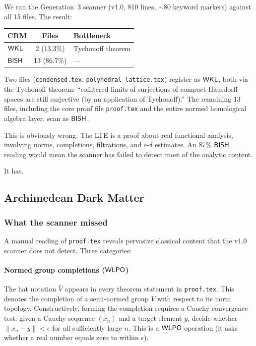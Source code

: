 We ran the Generation~3 scanner (v1.0, 810 lines, ${\sim}80$ keyword
markers) against all 15 files.  The result:

\begin{center}
\begin{tabular}{lcl}
\toprule
\textbf{CRM} & \textbf{Files} & \textbf{Bottleneck} \\
\midrule
$\textsf{WKL}$  & 2 (13.3\%) & Tychonoff theorem \\
$\textsf{BISH}$ & 13 (86.7\%) & --- \\
\bottomrule
\end{tabular}
\end{center}

Two files (\texttt{condensed.tex}, \texttt{polyhedral\_lattice.tex})
register as $\textsf{WKL}$, both via the Tychonoff theorem: ``cofiltered limits
of surjections of compact Hausdorff spaces are still surjective (by an
application of Tychonoff).''  The remaining 13 files, including the
core proof file \texttt{proof.tex} and the entire normed homological
algebra layer, scan as $\textsf{BISH}$.

This is obviously wrong.  The LTE is a proof about real functional
analysis, involving norms, completions, filtrations, and
$\varepsilon$-$\delta$ estimates.  An 87\% $\textsf{BISH}$ reading would
mean the scanner has failed to detect most of the analytic content.

It has.


\subsection{Archimedean Dark Matter}\label{part:dark-matter}

\subsubsection{What the scanner missed}\label{sec:missed}

A manual reading of \texttt{proof.tex} reveals pervasive classical
content that the v1.0 scanner does not detect.  Three categories:

\paragraph{Normed group completions ($\textsf{WLPO}$)}

The hat notation $\widehat{V}$ appears in every theorem statement in
\texttt{proof.tex}.  This denotes the completion of a semi-normed
group $V$ with respect to its norm topology.  Constructively, forming
the completion requires a Cauchy convergence test: given a Cauchy
sequence $(x_n)$ and a target element $y$, decide whether
$\|x_n - y\| < \epsilon$ for all sufficiently large $n$.  This is a
$\textsf{WLPO}$ operation (it asks whether a real number equals zero to
within $\epsilon$).

